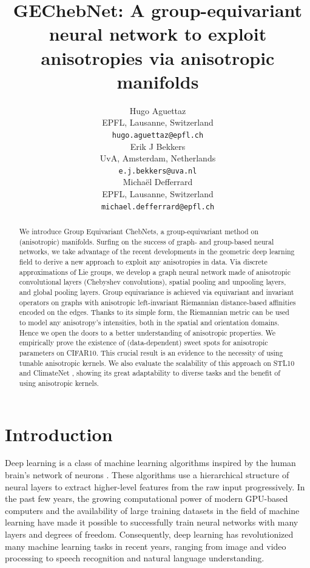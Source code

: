 \documentclass{article}
\title{GEChebNet: A group-equivariant neural network to exploit anisotropies via anisotropic manifolds}
\author{%
  Hugo Aguettaz \\
  EPFL, Lausanne, Switzerland \\
  \texttt{hugo.aguettaz@epfl.ch} \\
  \AND
  Erik J Bekkers \\
  UvA, Amsterdam, Netherlands \\
  \texttt{e.j.bekkers@uva.nl} \\
  \And
  Michaël Defferrard \\
  EPFL, Lausanne, Switzerland \\
  \texttt{michael.defferrard@epfl.ch} \\
}
\newcommand{\ebekkers}[1]{{\color[rgb]{.2,.8,.3}{#1}}}
\begin{document}
\maketitle

\begin{abstract}
    We introduce Group Equivariant ChebNets, a group-equivariant method on (anisotropic) manifolds. Surfing on the success of graph- and group-based neural networks, we take advantage of the recent developments in the geometric deep learning field to derive a new approach to exploit any anisotropies in data. Via discrete approximations of Lie groups, we develop a graph neural network made of anisotropic convolutional layers (Chebyshev convolutions), spatial pooling and unpooling layers, and global pooling layers. Group equivariance is achieved via equivariant and invariant operators on graphs with anisotropic left-invariant Riemannian distance-based affinities encoded on the edges. Thanks to its simple form, the Riemannian metric can be used to model any anisotropy's intensities\ebekkers{ (what does anisotropy's intensities mean?)}, both in the spatial and orientation domains. \ebekkers{This control on anisotropy of the Riemannian metrics allows to balance equivariance (anisotropic metric) against invariance (isotropic metric) of the graph convolution layers.} Hence we open the doors to a better understanding of anisotropic properties. We empirically prove the existence of (data-dependent) sweet spots for anisotropic parameters on CIFAR10. This crucial result is an evidence to the necessity of using tunable anisotropic kernels. We also evaluate the scalability of this approach on STL10 \ebekkers{(image data)} and ClimateNet \ebekkers{(spherical data)}, showing its great adaptability to diverse tasks and the benefit of using anisotropic kernels.
\end{abstract}

\section{Introduction} \label{sec:introduction}

Deep learning is a class of machine learning algorithms inspired by the human brain's network of neurons \citep{goodfellow2016deep}. These algorithms use a hierarchical structure of neural layers to extract higher-level features from the raw input progressively. In the past few years, the growing computational power of modern GPU-based computers and the availability of large training datasets in the field of machine learning have made it possible to successfully train neural networks with many layers and degrees of freedom. Consequently, deep learning has revolutionized many machine learning tasks in recent years, ranging from image and video processing to speech recognition and natural language understanding.
\end{document}
